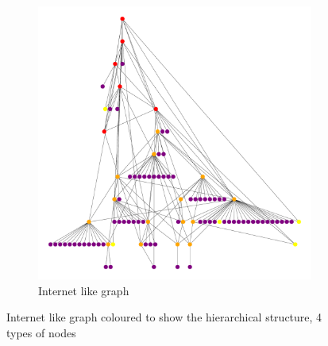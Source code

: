 \begin{figure}[ht]
\begin{subfigure}[b]{0.49\textwidth}
         \includegraphics[width=\textwidth]{images/internet_graph/graph_dot.pdf}
		 \caption{ Internet like graph}
         \label{fig:internet_topology_hierarchical}
     \end{subfigure}
        \caption{Internet like graph coloured to show the hierarchical structure,
		4 types of nodes}
        \label{fig:internet_like_topology}
\end{figure}
